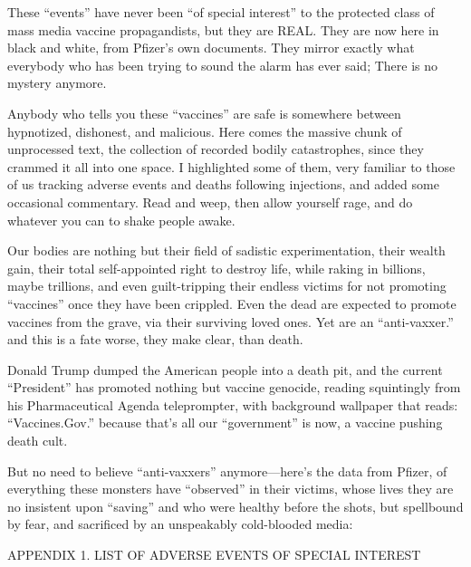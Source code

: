 \begin{refsection}
\begin{tcolorbox}[quote]
These \enquote{events} have never been \enquote{of special interest} to the protected class of mass media vaccine propagandists, but they are REAL. They are now here in black and white, from Pfizer's own documents. They mirror exactly what everybody who has been trying to sound the alarm has ever said; There is no mystery anymore.

Anybody who tells you these \enquote{vaccines} are safe is somewhere between hypnotized, dishonest, and malicious. Here comes the massive chunk of unprocessed text, the collection of recorded bodily catastrophes, since they crammed it all into one space. I highlighted some of them, very familiar to those of us tracking adverse events and deaths following injections, and added some occasional commentary. Read and weep, then allow yourself rage, and do whatever you can to shake people awake.

Our bodies are nothing but their field of sadistic experimentation, their wealth gain, their total self-appointed right to destroy life, while raking in billions, maybe trillions, and even guilt-tripping their endless victims for not promoting \enquote{vaccines} once they have been crippled. Even the dead are expected to promote vaccines from the grave, via their surviving loved ones. Yet  are an \enquote{anti-vaxxer.} and this is a fate worse, they make clear, than death.

Donald Trump dumped the American people into a death pit, and the current \enquote{President} has promoted nothing but vaccine genocide, reading squintingly from his Pharmaceutical Agenda teleprompter, with background wallpaper that reads: \enquote{Vaccines.Gov.} because that's all our \enquote{government} is now, a vaccine pushing death cult.

But no need to believe \enquote{anti-vaxxers} anymore---here's the data from Pfizer, of everything these monsters have \enquote{observed} in their victims, whose lives they are no insistent upon \enquote{saving} and who were healthy before the shots, but spellbound by fear, and sacrificed by an unspeakably cold-blooded media:

APPENDIX 1. LIST OF ADVERSE EVENTS OF SPECIAL INTEREST


\end{tcolorbox}
\end{refsection}
